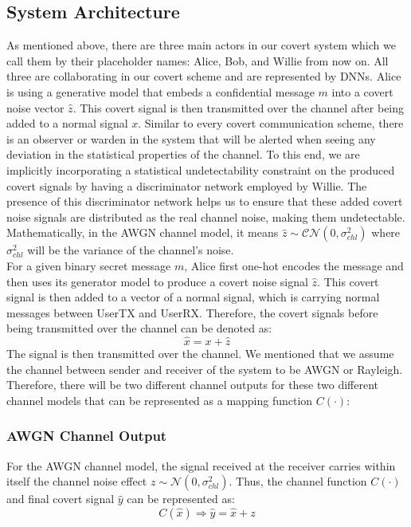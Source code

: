 \subsection{System Architecture}
As mentioned above, there are three main actors in our covert system which we call them by their placeholder names: Alice, Bob, and Willie from now on. All three are collaborating in our covert scheme and are represented by DNNs. Alice is using a generative model that embeds a confidential message \(m\) into a covert noise vector \(\hat{z}\). This covert signal is then transmitted over the channel after being added to a normal signal \(x\). Similar to every covert communication scheme, there is an observer or warden in the system that will be alerted when seeing any deviation in the statistical properties of the channel. To this end, we are implicitly incorporating a statistical undetectability constraint on the produced covert signals by having a discriminator network employed by Willie. The presence of this discriminator network helps us to ensure that these added covert noise signals are distributed as the real channel noise, making them undetectable. Mathematically, in the AWGN channel model, it means \(\hat{z} \sim \mathcal{CN}(0, \sigma_{chl}^2)\) where \(\sigma_{chl}^2\) will be the variance of the channel's noise.\\
For a given binary secret message \(m\), Alice first one-hot encodes the message and then uses its generator model to produce a covert noise signal \(\hat{z}\). This covert signal is then added to a vector of a normal signal, which is carrying normal messages between UserTX and UserRX. Therefore, the covert signals before being transmitted over the channel can be denoted as:
\begin{equation}
	\hat{x} = x + \hat{z}
\end{equation}
The signal is then transmitted over the channel. We mentioned that we assume the channel between sender and receiver of the system to be AWGN or Rayleigh. Therefore, there will be two different channel outputs for these two different channel models that can be represented as a mapping function \(C(\cdot)\):
\subsubsection{AWGN Channel Output}
For the AWGN channel model, the signal received at the receiver carries within itself the channel noise effect \(z \sim \mathcal{N}(0, \sigma_{chl}^2)\). Thus, the channel function \(C(\cdot)\) and final covert signal \(\hat{y}\) can be represented as:
\begin{equation}
	C(\hat{x}) \Rightarrow \hat{y} = \hat{x} + z
\end{equation}

